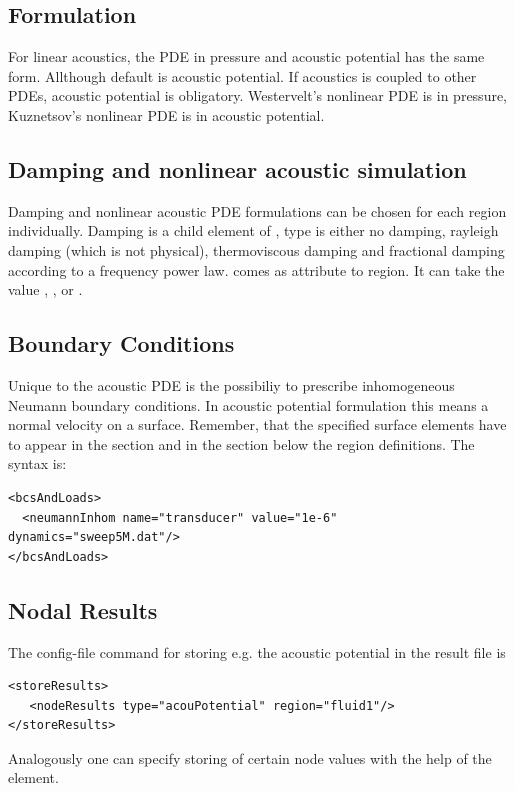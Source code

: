 \subsection{Formulation}
For linear acoustics, the PDE in pressure and acoustic potential has the same 
form. Allthough default is acoustic potential. If acoustics is coupled to 
other PDEs, acoustic potential is obligatory. Westervelt's nonlinear PDE is 
in pressure, Kuznetsov's nonlinear PDE is in acoustic potential.

\subsection{Damping and nonlinear acoustic simulation}
Damping and nonlinear acoustic PDE formulations can be chosen for each 
region individually. Damping is a child element of ,
type is either no damping, rayleigh damping (which is not physical), 
thermoviscous damping and fractional damping according to a 
frequency power law.
 comes as attribute to region. It can take the value ,
, or .

\subsection{Boundary Conditions}
Unique to the acoustic PDE is the possibiliy to prescribe inhomogeneous Neumann boundary conditions. In acoustic potential formulation this means a normal velocity on a surface. Remember, that the specified surface elements have to appear in the  section and in the  section below the region definitions. The syntax is:

\begin{verbatim} 
<bcsAndLoads>
  <neumannInhom name="transducer" value="1e-6" dynamics="sweep5M.dat"/>
</bcsAndLoads>
\end{verbatim}

\subsection{Nodal Results}
The config-file command for storing e.g. the acoustic potential in the result
file is

\begin{verbatim}      
<storeResults>
   <nodeResults type="acouPotential" region="fluid1"/>
</storeResults>
\end{verbatim}

Analogously one can specify storing of certain node values with the help of the  element.

